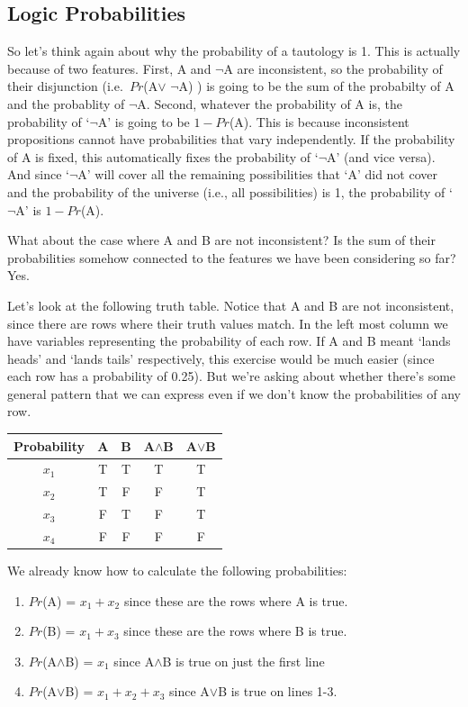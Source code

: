 \documentclass[]{tufte-book}
\providecommand{\tightlist}{%
  \setlength{\itemsep}{0pt}\setlength{\parskip}{0pt}}
\begin{document}
\hypertarget{logic-probabilities}{%
\subsection{Logic Probabilities}\label{logic-probabilities}}

So let's think again about why the probability of a tautology is 1. This is actually because of two features. First, A and \(\neg\)A are inconsistent, so the probability of their disjunction (i.e.~\(Pr\)(A\(\vee\) \(\neg\)A) ) is going to be the sum of the probabilty of A and the probablity of \(\neg\)A. Second, whatever the probability of A is, the probability of `\(\neg\)A' is going to be \(1-Pr\)(A). This is because inconsistent propositions cannot have probabilities that vary independently. If the probability of A is fixed, this automatically fixes the probability of `\(\neg\)A' (and vice versa). And since `\(\neg\)A' will cover all the remaining possibilities that `A' did not cover and the probability of the universe (i.e., all possibilities) is 1, the probability of `\(\neg\)A' is \(1-Pr\)(A).

What about the case where A and B are not inconsistent? Is the sum of their probabilities somehow connected to the features we have been considering so far? Yes.

Let's look at the following truth table. Notice that A and B are not inconsistent, since there are rows where their truth values match. In the left most column we have variables representing the probability of each row. If A and B meant `lands heads' and `lands tails' respectively, this exercise would be much easier (since each row has a probability of 0.25). But we're asking about whether there's some general pattern that we can express even if we don't know the probabilities of any row.

\begin{longtable}[]{@{}ccccc@{}}
\toprule
Probability & A & B & A\(\wedge\)B & A\(\vee\)B\tabularnewline
\midrule
\endhead
\(x_1\) & T & T & T & T\tabularnewline
\(x_2\) & T & F & F & T\tabularnewline
\(x_3\) & F & T & F & T\tabularnewline
\(x_4\) & F & F & F & F\tabularnewline
\bottomrule
\end{longtable}

We already know how to calculate the following probabilities:

\begin{enumerate}
\def\labelenumi{\arabic{enumi}.}
\tightlist
\item
  \(Pr\)(A) = \(x_1 + x_2\) since these are the rows where A is true.
\item
  \(Pr\)(B) = \(x_1 + x_3\) since these are the rows where B is true.
\item
  \(Pr\)(A\(\wedge\)B) = \(x_1\) since A\(\wedge\)B is true on just the first line
\item
  \(Pr\)(A\(\vee\)B) = \(x_1 + x_2 + x_3\) since A\(\vee\)B is true on lines 1-3.
\end{enumerate}
\end{document}
